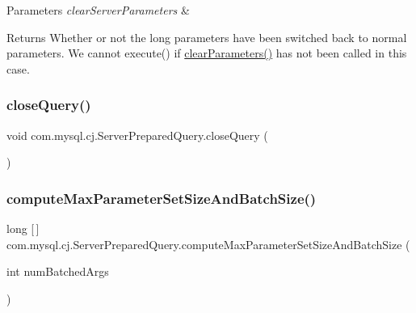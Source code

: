 \begin{DoxyParams}{Parameters}
{\em clear\+Server\+Parameters} & \\
\hline
\end{DoxyParams}
\begin{DoxyReturn}{Returns}
Whether or not the long parameters have been \textquotesingle{}switched\textquotesingle{} back to normal parameters. We cannot execute() if \mbox{\hyperlink{classcom_1_1mysql_1_1cj_1_1_server_prepared_query_aa5d47640d47bde9fff14feaaf1ad2bf1}{clear\+Parameters()}} has not been called in this case. 
\end{DoxyReturn}
\mbox{\label{classcom_1_1mysql_1_1cj_1_1_server_prepared_query_a4f5928a31d2a6f738cf93f06984c22e4}} 
\subsubsection{\texorpdfstring{close\+Query()}{closeQuery()}}
{\footnotesize\ttfamily void com.\+mysql.\+cj.\+Server\+Prepared\+Query.\+close\+Query (\begin{DoxyParamCaption}{ }\end{DoxyParamCaption})}

\mbox{\label{classcom_1_1mysql_1_1cj_1_1_server_prepared_query_a2b7f3b7ca471b130821b1a3f85f9743e}} 
\subsubsection{\texorpdfstring{compute\+Max\+Parameter\+Set\+Size\+And\+Batch\+Size()}{computeMaxParameterSetSizeAndBatchSize()}}
{\footnotesize\ttfamily long \mbox{[}$\,$\mbox{]} com.\+mysql.\+cj.\+Server\+Prepared\+Query.\+compute\+Max\+Parameter\+Set\+Size\+And\+Batch\+Size (\begin{DoxyParamCaption}\item[{int}]{num\+Batched\+Args }\end{DoxyParamCaption})\hspace{0.3cm}{\ttfamily [protected]}}

